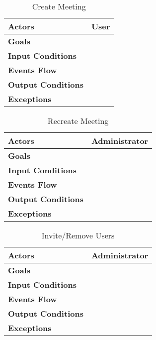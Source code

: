 \begin{table}[H]
	\centering
	\def\arraystretch{1.5}
	\begin{tabular}{|p{7cm}|p{7cm}|}
		\hline
		\textbf{Actors}            & User		    \\ \hline
		\textbf{Goals}             &            \\ \hline
		\textbf{Input Conditions}  &            \\ \hline
		\textbf{Events Flow}       &            \\ \hline
		\textbf{Output Conditions} &            \\ \hline
		\textbf{Exceptions}        &            \\ \hline
	\end{tabular}
	\caption{Create Meeting}
\end{table}

\begin{table}[H]
	\centering
	\def\arraystretch{1.5}
	\begin{tabular}{|p{7cm}|p{7cm}|}
		\hline
		\textbf{Actors}            & Administrator    \\ \hline
		\textbf{Goals}             &            \\ \hline
		\textbf{Input Conditions}  &            \\ \hline
		\textbf{Events Flow}       &            \\ \hline
		\textbf{Output Conditions} &            \\ \hline
		\textbf{Exceptions}        &            \\ \hline
	\end{tabular}
	\caption{Recreate Meeting}
\end{table}

\begin{table}[H]
	\centering
	\def\arraystretch{1.5}
	\begin{tabular}{|p{7cm}|p{7cm}|}
		\hline
		\textbf{Actors}            & Administrator    \\ \hline
		\textbf{Goals}             &            \\ \hline
		\textbf{Input Conditions}  &            \\ \hline
		\textbf{Events Flow}       &            \\ \hline
		\textbf{Output Conditions} &            \\ \hline
		\textbf{Exceptions}        &            \\ \hline
	\end{tabular}
	\caption{Invite/Remove Users}
\end{table}

